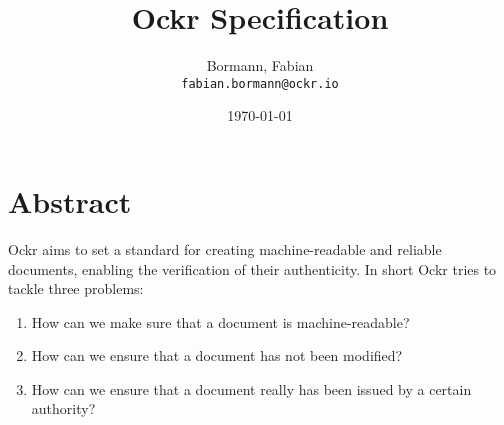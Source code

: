 \documentclass{article}
\title{Ockr Specification}
\author{
  Bormann, Fabian\\
  \texttt{fabian.bormann@ockr.io}
  \and
  \qrcode{https://github.com/ockr-io/ockr-specification/graphs/contributors}
}
\date{\today}
\begin{document}
\maketitle

\tableofcontents

\section{Abstract}

Ockr aims to set a standard for creating machine-readable and reliable documents, 
enabling the verification of their authenticity. In short Ockr tries to tackle 
three problems:

\begin{enumerate}
    \item How can we make sure that a document is machine-readable?
    \item How can we ensure that a document has not been modified?
    \item How can we ensure that a document really has been issued by a certain authority?
\end{enumerate}





\end{document}
